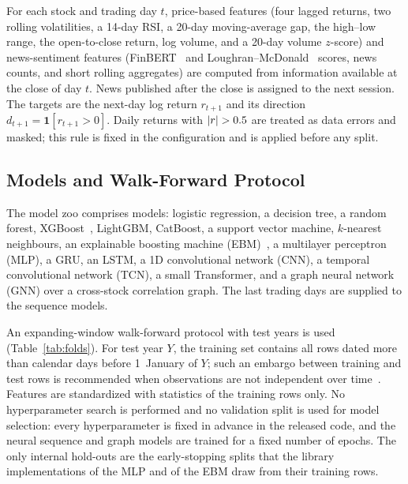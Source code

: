 \documentclass[conference]{IEEEtran}
\begin{document}
For each stock and trading day $t$, \nFeatPrice{} price-based features (four
lagged returns, two rolling volatilities, a 14-day RSI, a 20-day
moving-average gap, the high--low range, the open-to-close return, log
volume, and a 20-day volume $z$-score) and \nFeatSent{} news-sentiment
features (FinBERT~\cite{araci2019finbert} and
Loughran--McDonald~\cite{loughran2011liability} scores, news counts, and
short rolling aggregates) are computed from information available at the
close of day $t$. News published after the close is assigned to the next
session. The targets are the next-day log return $r_{t+1}$ and its direction
$d_{t+1}=\mathbf{1}[r_{t+1}>0]$. Daily returns with $|r|>\returnClip$ are
treated as data errors and masked; this rule is fixed in the configuration
and is applied before any split.

\subsection{Models and Walk-Forward Protocol}
The model zoo comprises \nModelsZoo{} models: logistic regression, a
decision tree, a random forest, XGBoost~\cite{chen2016xgboost}, LightGBM,
CatBoost, a support vector machine, $k$-nearest neighbours, an explainable
boosting machine (EBM)~\cite{nori2019interpretml}, a multilayer perceptron
(MLP), a GRU, an LSTM, a 1D convolutional network (CNN), a temporal
convolutional network (TCN), a small Transformer, and a graph neural network
(GNN) over a cross-stock correlation graph. The last \lookback{} trading
days are supplied to the sequence models.

An expanding-window walk-forward protocol with \nFolds{} test years is used
(Table~\ref{tab:folds}). For test year $Y$, the training set contains all
rows dated more than \embargoDays{} calendar days before 1~January of $Y$;
such an embargo between training and test rows is recommended when
observations are not independent over time~\cite{lopez2018advances}.
Features are standardized with statistics of the training rows only. No
hyperparameter search is performed and no validation split is used for model
selection: every hyperparameter is fixed in advance in the released code,
and the neural sequence and graph models are trained for a fixed number of
epochs. The only internal hold-outs are the early-stopping splits that the
library implementations of the MLP and of the EBM draw from their training
rows.

\begin{table}[t]
\caption{Walk-forward folds (expanding window) and the split used for
recovery scoring. Embargoed rows are used neither for training nor for
testing. The panel ends on \panelEnd.}
\label{tab:folds}
\centering\footnotesize
\setlength{\tabcolsep}{4pt}

\end{table}
\end{document}
